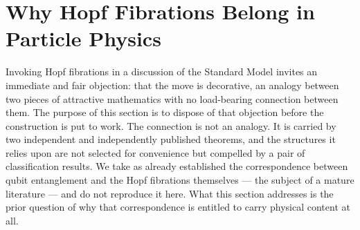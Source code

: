 %
%      
%      
%      
%

\section{Why Hopf Fibrations Belong in Particle Physics}
\label{sec:hopf-justification}

Invoking Hopf fibrations in a discussion of the Standard Model invites an immediate and fair objection: that the move is decorative, an analogy between two pieces of attractive mathematics with no load-bearing connection between them. The purpose of this section is to dispose of that objection before the construction is put to work. The connection is not an analogy. It is carried by two independent and independently published theorems, and the structures it relies upon are not selected for convenience but compelled by a pair of classification results. We take as already established the correspondence between qubit entanglement and the Hopf fibrations themselves --- the subject of a mature literature \autocite{mosseri2001hopf,bernevigchen2003geometry} --- and do not reproduce it here. What this section addresses is the prior question of why that correspondence is entitled to carry physical content at all.

